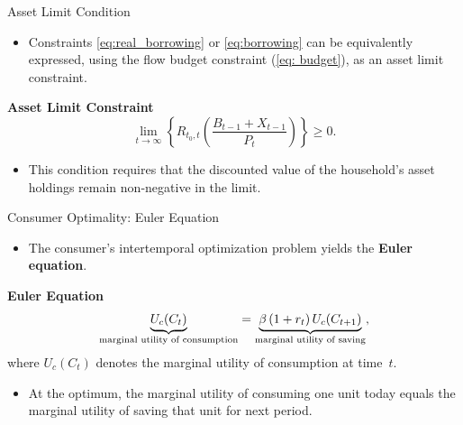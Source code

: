 \documentclass[11pt,aspectratio=169]{beamer}
\begin{document}
\begin{frame}[label=limit]{Asset Limit Condition}

\begin{itemize}
    \item Constraints  \eqref{eq:real_borrowing} or \eqref{eq:borrowing} can be equivalently expressed, using the flow budget constraint (\ref{eq: budget}), as an asset limit constraint.
\end{itemize}

\vspace{0.25cm}
\noindent\textbf{ Asset Limit Constraint}
\begin{equation}
\lim_{t\to \infty} \left\{ R_{t_0,t} \left( \frac{B_{t-1}+X_{t-1}}{P_t} \right) \right\} \ge 0.  \label{Blimit}
\end{equation}

\begin{itemize}
    \item This condition requires that the discounted value of the household’s asset holdings remain non-negative in the limit.
\end{itemize}

\vspace{0.3cm}
\begin{center}
\hyperlink{limit_proof}{}
\end{center}

\end{frame}
\begin{frame}[label=euler]{Consumer Optimality: Euler Equation}


\begin{itemize}
  \item The consumer’s intertemporal optimization problem yields the \textbf{Euler equation}.
\end{itemize}

\vspace{0.3cm}
\noindent\textbf{Euler Equation}
\begin{equation}
\underbrace{U_c(C_t)}_{\text{\scriptsize marginal utility of consumption}}
= 
\underbrace{\beta\,(1+r_t)\,U_c(C_{t+1})}_{\text{\scriptsize marginal utility of saving}},
\label{eq:euler}
\end{equation}
\hspace{0.75cm}where $U_c(C_t)$ denotes the marginal utility of consumption at time~$t$.
\vspace{0.2cm}
\begin{itemize}
  \item At the optimum, the marginal utility of consuming one unit today equals the marginal utility of saving that unit for next period.

\end{itemize}

\vspace{0.25cm}
\begin{center}
  \hyperlink{euler_proof}{}
\end{center}
\end{frame}
\end{document}
